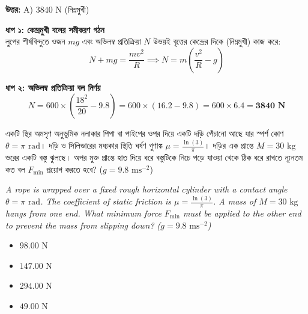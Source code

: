 \documentclass[12pt, a4paper]{article}
\begin{document}
{\begin{tcolorbox}[answerbox]
\textbf{\color{success} উত্তর:} A) $3840\text{ N}$ (নিম্নমুখী)
\end{tcolorbox}
\vspace{1em}

\begin{tcolorbox}[solutionbox={সমাধান (Solution)}]
\noindent
\textbf{ধাপ ১: কেন্দ্রমুখী বলের সমীকরণ গঠন} \\
লুপের শীর্ষবিন্দুতে ওজন $mg$ এবং অভিলম্ব প্রতিক্রিয়া $N$ উভয়ই বৃত্তের কেন্দ্রের দিকে (নিম্নমুখী) কাজ করে:
\[N + mg = \frac{m v^2}{R} \implies N = m \left(\frac{v^2}{R} - g\right)\]

\vspace{0.5em}
\noindent\textbf{ধাপ ২: অভিলম্ব প্রতিক্রিয়া বল নির্ণয়} \\
\[N = 600 \times \left(\frac{18^2}{20} - 9.8\right) = 600 \times (16.2 - 9.8) = 600 \times 6.4 = \mathbf{3840\text{ N}}\]
\end{tcolorbox}

\vspace{2em}

\begin{tcolorbox}[questionbox={প্রশ্ন (Question) 40}]
\noindent
একটি স্থির অমসৃণ অনুভূমিক নলাকার পিপা বা পাইপের ওপর দিয়ে একটি দড়ি পেঁচানো আছে যার স্পর্শ কোণ $\theta = \pi\text{ rad}$। দড়ি ও সিলিন্ডারের মধ্যকার স্থিতি ঘর্ষণ গুণাঙ্ক $\mu = \frac{\ln(3)}{\pi}$। দড়ির এক প্রান্তে $M = 30\text{ kg}$ ভরের একটি বস্তু ঝুলছে। অপর মুক্ত প্রান্তে হাত দিয়ে ধরে বস্তুটিকে নিচে পড়ে যাওয়া থেকে ঠিক ধরে রাখতে ন্যূনতম কত বল $F_{\text{min}}$ প্রয়োগ করতে হবে? ($g = 9.8\text{ ms}^{-2}$)
\vspace{0.8em}
\begin{english}
\noindent\textit{\color{darkgray}
A rope is wrapped over a fixed rough horizontal cylinder with a contact angle $\theta = \pi\text{ rad}$. The coefficient of static friction is $\mu = \frac{\ln(3)}{\pi}$. A mass of $M = 30\text{ kg}$ hangs from one end. What minimum force $F_{\text{min}}$ must be applied to the other end to prevent the mass from slipping down? ($g = 9.8\text{ ms}^{-2}$)
}
\end{english}
\end{tcolorbox}

\begin{itemize}[label={}, leftmargin=1cm, itemsep=0.5em]
\item[\textbf{A)}] $98.00\text{ N}$
\item[\textbf{B)}] $147.00\text{ N}$
\item[\textbf{C)}] $294.00\text{ N}$
\item[\textbf{D)}] $49.00\text{ N}$
\end{itemize}
\vspace{0.5em}

}
\end{document}
